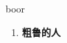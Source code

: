 
\begin{frame}
{\huge boor}
\begin{center}
\begin{enumerate}\Large
  \item \textbf{粗鲁的人}
\end{enumerate}
\end{center}
\end{frame}
